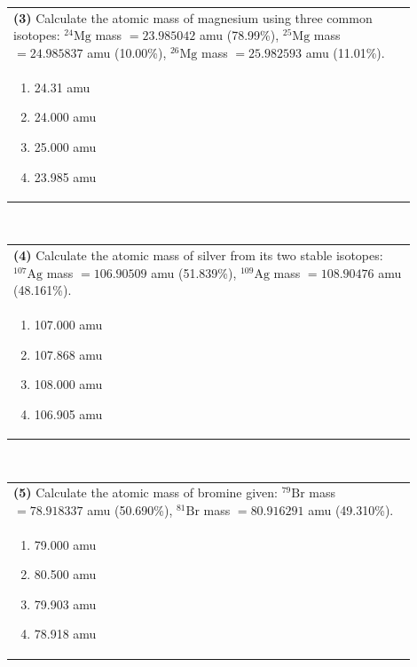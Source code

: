 \documentclass{article}
\begin{document}
\vspace{0.5cm}
\noindent \begin{tabular}{|p{0.9\linewidth}|}
\hline
\vspace{0.2cm}
\textbf{(3)} Calculate the atomic mass of magnesium using three common isotopes: $^{24}\text{Mg}$ mass $=23.985042$ amu (78.99\%), $^{25}\text{Mg}$ mass $=24.985837$ amu (10.00\%), $^{26}\text{Mg}$ mass $=25.982593$ amu (11.01\%). \\
\begin{minipage}[t]{0.85\linewidth}
\begin{enumerate}[label=\alph*.]
   \item 24.31 amu
   \item 24.000 amu
   \item 25.000 amu
   \item 23.985 amu
\end{enumerate}
\end{minipage}\\
\hline
\end{tabular}
\\

\vspace{0.5cm}
\noindent \begin{tabular}{|p{0.9\linewidth}|}
\hline
\vspace{0.2cm}
\textbf{(4)} Calculate the atomic mass of silver from its two stable isotopes: $^{107}\text{Ag}$ mass $=106.90509$ amu (51.839\%), $^{109}\text{Ag}$ mass $=108.90476$ amu (48.161\%). \\
\begin{minipage}[t]{0.85\linewidth}
\begin{enumerate}[label=\alph*.]
   \item 107.000 amu
   \item 107.868 amu
   \item 108.000 amu
   \item 106.905 amu
\end{enumerate}
\end{minipage}\\
\hline
\end{tabular}
\\
 \newpage \noindent 
\noindent \begin{tabular}{|p{0.9\linewidth}|}
\hline
\vspace{0.2cm}
\textbf{(5)} Calculate the atomic mass of bromine given: $^{79}\text{Br}$ mass $=78.918337$ amu (50.690\%), $^{81}\text{Br}$ mass $=80.916291$ amu (49.310\%). \\
\begin{minipage}[t]{0.85\linewidth}
\begin{enumerate}[label=\alph*.]
   \item 79.000 amu
   \item 80.500 amu
   \item 79.903 amu
   \item 78.918 amu
\end{enumerate}
\end{minipage}\\
\hline
\end{tabular}
\\
\end{document}
